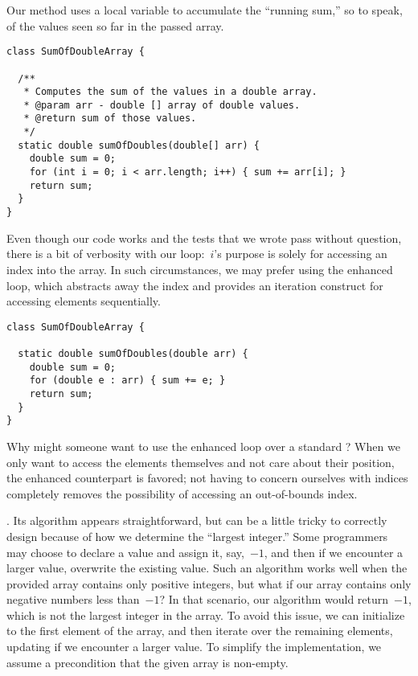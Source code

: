 Our method uses a local variable to accumulate the ``running sum,'' so to speak, of the values seen so far in the passed array.

\begin{lstlisting}[language=MyJava]
class SumOfDoubleArray {

  /**
   * Computes the sum of the values in a double array.
   * @param arr - double [] array of double values.
   * @return sum of those values.
   */
  static double sumOfDoubles(double[] arr) {
    double sum = 0;
    for (int i = 0; i < arr.length; i++) { sum += arr[i]; }
    return sum;
  }
}
\end{lstlisting}

Even though our code works and the tests that we wrote pass without question, there is a bit of verbosity with our loop:~$i$'s purpose is solely for accessing an index into the array. 
In such circumstances, we may prefer using the enhanced  loop, which abstracts away the index and provides an iteration construct for accessing elements sequentially.

\begin{lstlisting}[language=MyJava]
class SumOfDoubleArray {

  static double sumOfDoubles(double arr) {
    double sum = 0;
    for (double e : arr) { sum += e; }
    return sum;
  }
}
\end{lstlisting}

Why might someone want to use the enhanced  loop over a standard ? 
When we only want to access the elements themselves and not care about their position, the enhanced counterpart is favored; not having to concern ourselves with indices completely removes the possibility of accessing an out-of-bounds index. 

. Its algorithm appears straightforward, but can be a little tricky to correctly design because of how we determine the ``largest integer.'' 
Some programmers may choose to declare a value  and assign it, say,~$-1$, and then if we encounter a larger value, overwrite the existing value. 
Such an algorithm works well when the provided array contains only positive integers, but what if our array contains only negative numbers less than~$-1$? 
In that scenario, our algorithm would return~$-1$, which is not the largest integer in the array. 
To avoid this issue, we can initialize  to the first element of the array, and then iterate over the remaining elements, updating  if we encounter a larger value.
To simplify the implementation, we assume a precondition that the given array is non-empty.


